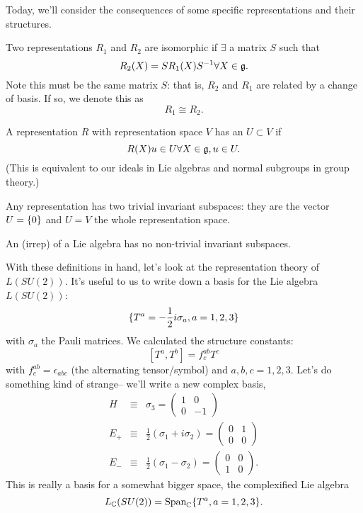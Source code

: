 Today, we'll consider the consequences of some specific representations and their structures.

\begin{defn}
Two representations $R_1$ and $R_2$ are isomorphic if $\exists$ a matrix $S$ such that
$$R_2(X)=S R_1(X)S^{-1} \forall X\in \mathfrak{g}.$$
Note this must be the same matrix $S$: that is, $R_2$ and $R_1$ are related by a change of basis. If so, we denote this as $$R_1\cong R_2.$$
\end{defn}
\begin{defn}
A representation $R$ with representation space $V$ has an  $U\subset V$ if
$$R(X)u\in U \forall X\in \mathfrak{g}, u\in U.$$
(This is equivalent to our ideals in Lie algebras and normal subgroups in group theory.)

Any representation has two trivial invariant subspaces: they are the vector $U=\{0\}$ and $U=V$ the whole representation space.
\end{defn}
\begin{defn}
An  (irrep) of a Lie algebra has no non-trivial invariant subspaces.
\end{defn}

With these definitions in hand, let's look at the representation theory of $L(SU(2))$. It's useful to us to write down a basis for the Lie algebra $L(SU(2))$:
$$\{T^a=-\frac{1}{2}i\sigma_a,a=1,2,3\}$$
with $\sigma_a$ the Pauli matrices. We calculated the structure constants:
$$[T^a,T^b]=f^{ab}_c T^c$$ with $f^{ab}_c=\epsilon_{abc}$ (the alternating tensor/symbol) and $a,b,c=1,2,3$. Let's do something kind of strange-- we'll write a new complex basis,
\begin{eqnarray*}
H&\equiv &\sigma_3 =\begin{pmatrix}
1&0\\0&-1
\end{pmatrix}\\
E_+ &\equiv& \frac{1}{2}(\sigma_1+i\sigma_2) =\begin{pmatrix}
0&1\\0&0
\end{pmatrix}\\
E_-&\equiv&\frac{1}{2}(\sigma_1 - \sigma_2)=\begin{pmatrix}
0&0\\1&0
\end{pmatrix}.
\end{eqnarray*}
This is really a basis for a somewhat bigger space, the complexified Lie algebra
$$L_{\mathbb{C}} (SU(2))=\text{Span}_{\mathbb{C}}\{T^a, a=1,2,3\}.$$

